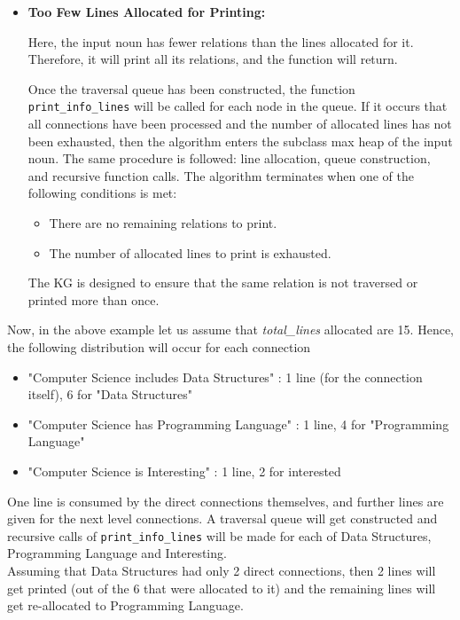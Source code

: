\documentclass[conference]{IEEEtran}
\begin{document}
\begin{itemize}
    \item \textbf{Too Few Lines Allocated for Printing:}
    
    Here, the input noun has fewer relations than the lines allocated for it. Therefore, it will print all its relations, and the function will return. 
    
    Once the traversal queue has been constructed, the function \texttt{print\_info\_lines} will be called for each node in the queue. If it occurs that all connections have been processed and the number of allocated lines has not been exhausted, then the algorithm enters the subclass max heap of the input noun. The same procedure is followed: line allocation, queue construction, and recursive function calls. The algorithm terminates when one of the following conditions is met:
    \begin{itemize}
        \item There are no remaining relations to print.
        \item The number of allocated lines to print is exhausted.
    \end{itemize}
    
    The KG is designed to ensure that the same relation is not traversed or printed more than once.
\end{itemize}

Now, in the above example let us assume that \textit{total\_lines} allocated are 15. Hence, the following distribution will occur for each connection
\begin{itemize}
\item "Computer Science includes Data Structures" : 1 line (for the connection itself), 6 for "Data Structures"
\item "Computer Science has Programming Language" : 1 line, 4 for "Programming Language"
\item "Computer Science is Interesting" : 1 line, 2 for interested
\end{itemize}

One line is consumed by the direct connections themselves, and further lines are given for the next level connections.
A traversal queue will get constructed and recursive calls of \texttt{print\_info\_lines} will be made for each of Data Structures, Programming Language and Interesting.\\

Assuming that Data Structures had only 2 direct connections, then 2 lines will get printed (out of the 6 that were allocated to it) and the remaining lines will get re-allocated to Programming Language.
\end{document}
